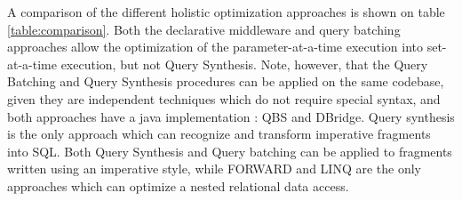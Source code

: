 
A comparison of the different holistic optimization approaches is shown on table \ref{table:comparison}. Both the declarative middleware and query batching approaches allow the optimization of the parameter-at-a-time execution into set-at-a-time execution, but not Query Synthesis. Note, however, that the Query Batching and Query Synthesis procedures can be applied on the same codebase, given they are independent techniques which do not require special syntax, and both approaches have a java implementation : QBS and DBridge.  Query synthesis is the only approach which can recognize and transform imperative fragments into SQL. Both Query Synthesis and Query batching can be applied to fragments written using an imperative style, while FORWARD and LINQ are the only approaches which can optimize a nested relational data access.